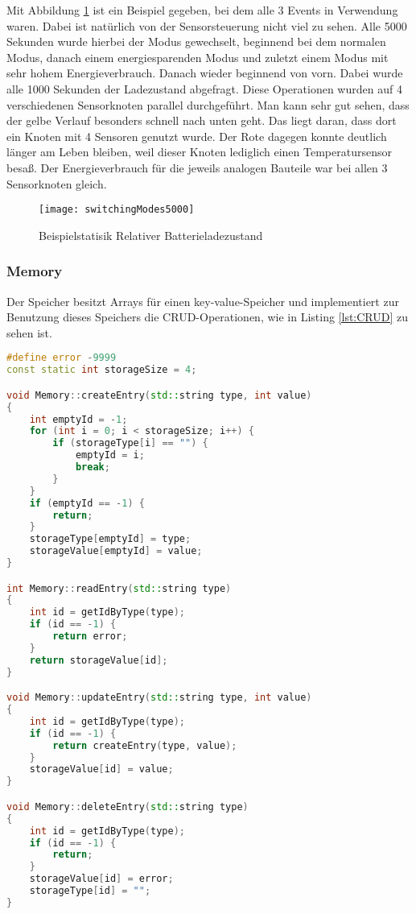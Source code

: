 Mit Abbildung \ref{fig:switchingModes5000} ist ein Beispiel gegeben, bei dem alle 3 Events in Verwendung waren. Dabei ist natürlich von der Sensorsteuerung nicht viel zu sehen. Alle 5000 Sekunden wurde hierbei der Modus gewechselt, beginnend bei dem normalen Modus, danach einem energiesparenden Modus und zuletzt einem Modus mit sehr hohem Energieverbrauch. Danach wieder beginnend von vorn. Dabei wurde alle 1000 Sekunden der Ladezustand abgefragt. Diese Operationen wurden auf 4 verschiedenen Sensorknoten parallel durchgeführt. Man kann sehr gut sehen, dass der gelbe Verlauf besonders schnell nach unten geht. Das liegt daran, dass dort ein Knoten mit 4 Sensoren genutzt wurde. Der Rote dagegen konnte deutlich länger am Leben bleiben, weil dieser Knoten lediglich einen Temperatursensor besaß. Der Energieverbrauch für die jeweils analogen Bauteile war bei allen 3 Sensorknoten gleich.

\begin{figure}[htbp]
\centering
\caption{Beispielstatisik Relativer Batterieladezustand}
\label{fig:switchingModes5000}
\texttt{[image: switchingModes5000]}
\end{figure}

\subsubsection{Memory}

Der Speicher besitzt Arrays für einen key-value-Speicher und implementiert zur Benutzung dieses Speichers die CRUD-Operationen, wie in Listing \ref{lst:CRUD} zu sehen ist.

\begin{lstlisting}[language=C++, label=lst:CRUD, caption=CRUD-Operationen vom Memory]
#define error -9999
const static int storageSize = 4;

void Memory::createEntry(std::string type, int value)
{
    int emptyId = -1;
    for (int i = 0; i < storageSize; i++) {
        if (storageType[i] == "") {
            emptyId = i;
            break;
        }
    }
    if (emptyId == -1) {
        return;
    }
    storageType[emptyId] = type;
    storageValue[emptyId] = value;
}

int Memory::readEntry(std::string type)
{
    int id = getIdByType(type);
    if (id == -1) {
        return error;
    }
    return storageValue[id];
}

void Memory::updateEntry(std::string type, int value)
{
    int id = getIdByType(type);
    if (id == -1) {
        return createEntry(type, value);
    }
    storageValue[id] = value;
}

void Memory::deleteEntry(std::string type)
{
    int id = getIdByType(type);
    if (id == -1) {
        return;
    }
    storageValue[id] = error;
    storageType[id] = "";
}
\end{lstlisting}

